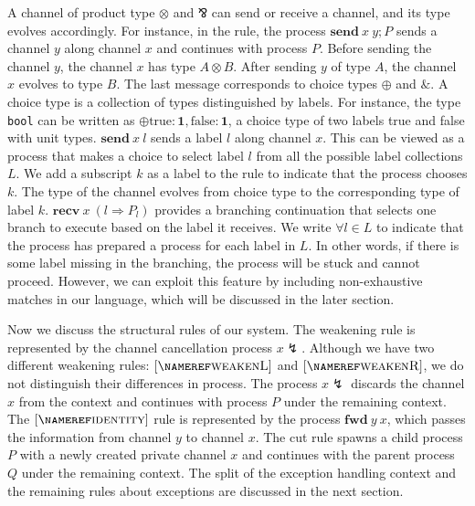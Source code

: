 \documentclass[12pt, openany]{memoir}
\newcommand*{\pare}[0]{\mathbin{\bindnasrepma}}
\newcommand*{\send}[2]{\textbf{send}\ #1\ #2}
\newcommand*{\recv}[2]{\textbf{recv}\ #1\ #2}
\newcommand*{\fwd}[2]{\textbf{fwd}\ #1\ #2}
\newcommand*{\cancel}[1]{#1 \lightning}
\begin{document}
A channel of product type $\otimes$ and $\pare$ can send or receive a channel, and its type evolves accordingly. 
For instance, in the  rule, the process $\send{x}{y}; P$ sends a channel $y$ along channel $x$ and continues with process $P$. 
Before sending the channel $y$, the channel $x$ has type $A \otimes B$. 
After sending $y$ of type $A$, the channel $x$ evolves to type $B$. The last message corresponds to choice types $\oplus$ and $\&$. 
A choice type is a collection of types distinguished by labels. 
For instance, the type \texttt{bool} can be written as $\oplus{\text{true} : \textbf{1}, \text{false} : \textbf{1}}$, 
a choice type of two labels true and false with unit types. $\send{x}{l}$ sends a label $l$ along channel $x$. 
This can be viewed as a process that makes a choice to select label $l$ from all the possible label collections $L$. 
We add a subscript $k$ as a label to the  rule to indicate that the process chooses $k$. 
The type of the channel evolves from choice type to the corresponding type of label $k$. 
$\recv{x}{(l \Rightarrow P_l)}$ provides a branching continuation that selects one branch to execute based on the label it receives. 
We write $\forall l \in L$ to indicate that the process has prepared a process for each label in $L$. 
In other words, if there is some label missing in the branching, the process will be stuck and cannot proceed. 
However, we can exploit this feature by including non-exhaustive matches in our language, which will be discussed in the later section.

Now we discuss the structural rules of our system. The weakening rule is represented by the channel cancellation process $\cancel{x}$. 
Although we have two different weakening rules: $\ruleref{weakenL}$ and $\ruleref{weakenR}$, we do not distinguish their differences in process. 
The process $\cancel{x}$ discards the channel $x$ from the context and continues with process $P$ under the remaining context. 
The $\ruleref{identity}$ rule is represented by the process $\fwd{y}{x}$, which passes the information from channel $y$ to channel $x$. 
The cut rule spawns a child process $P$ with a newly created private channel $x$ and continues with the parent process $Q$ under the remaining context. 
The split of the exception handling context and the remaining rules about exceptions are discussed in the next section.
\end{document}
